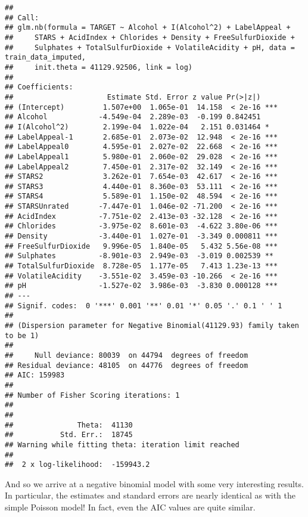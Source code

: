 \documentclass[
]{article}
\begin{document}
\begin{verbatim}
## 
## Call:
## glm.nb(formula = TARGET ~ Alcohol + I(Alcohol^2) + LabelAppeal + 
##     STARS + AcidIndex + Chlorides + Density + FreeSulfurDioxide + 
##     Sulphates + TotalSulfurDioxide + VolatileAcidity + pH, data = train_data_imputed, 
##     init.theta = 41129.92506, link = log)
## 
## Coefficients:
##                      Estimate Std. Error z value Pr(>|z|)    
## (Intercept)         1.507e+00  1.065e-01  14.158  < 2e-16 ***
## Alcohol            -4.549e-04  2.289e-03  -0.199 0.842451    
## I(Alcohol^2)        2.199e-04  1.022e-04   2.151 0.031464 *  
## LabelAppeal-1       2.685e-01  2.073e-02  12.948  < 2e-16 ***
## LabelAppeal0        4.595e-01  2.027e-02  22.668  < 2e-16 ***
## LabelAppeal1        5.980e-01  2.060e-02  29.028  < 2e-16 ***
## LabelAppeal2        7.450e-01  2.317e-02  32.149  < 2e-16 ***
## STARS2              3.262e-01  7.654e-03  42.617  < 2e-16 ***
## STARS3              4.440e-01  8.360e-03  53.111  < 2e-16 ***
## STARS4              5.589e-01  1.150e-02  48.594  < 2e-16 ***
## STARSUnrated       -7.447e-01  1.046e-02 -71.200  < 2e-16 ***
## AcidIndex          -7.751e-02  2.413e-03 -32.128  < 2e-16 ***
## Chlorides          -3.975e-02  8.601e-03  -4.622 3.80e-06 ***
## Density            -3.440e-01  1.027e-01  -3.349 0.000811 ***
## FreeSulfurDioxide   9.996e-05  1.840e-05   5.432 5.56e-08 ***
## Sulphates          -8.901e-03  2.949e-03  -3.019 0.002539 ** 
## TotalSulfurDioxide  8.728e-05  1.177e-05   7.413 1.23e-13 ***
## VolatileAcidity    -3.551e-02  3.459e-03 -10.266  < 2e-16 ***
## pH                 -1.527e-02  3.986e-03  -3.830 0.000128 ***
## ---
## Signif. codes:  0 '***' 0.001 '**' 0.01 '*' 0.05 '.' 0.1 ' ' 1
## 
## (Dispersion parameter for Negative Binomial(41129.93) family taken to be 1)
## 
##     Null deviance: 80039  on 44794  degrees of freedom
## Residual deviance: 48105  on 44776  degrees of freedom
## AIC: 159983
## 
## Number of Fisher Scoring iterations: 1
## 
## 
##               Theta:  41130 
##           Std. Err.:  18745 
## Warning while fitting theta: iteration limit reached 
## 
##  2 x log-likelihood:  -159943.2
\end{verbatim}

And so we arrive at a negative binomial model with some very interesting
results. In particular, the estimates and standard errors are nearly
identical as with the simple Poisson model! In fact, even the AIC values
are quite similar.
\end{document}
